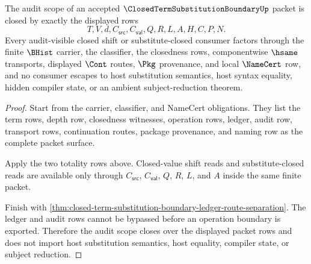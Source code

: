 \begin{theorem}
\label{thm:closed-term-substitution-boundary-audit-scope-closure}
The audit scope of an accepted $\ClosedTermSubstitutionBoundaryUp$ packet is
closed by exactly the displayed rows
$$
T,V,d,C_{\mathsf{src}},C_{\mathsf{val}},Q,R,L,A,H,C,P,N.
$$
Every audit-visible closed shift or substitute-closed consumer factors through
the finite $\BHist$ carrier, the classifier, the closedness rows,
componentwise $\hsame$ transports, displayed $\Cont$ routes, $\Pkg$ provenance,
and local $\NameCert$ row, and no consumer escapes to host substitution
semantics, host syntax equality, hidden compiler state, or an ambient
subject-reduction theorem.
\end{theorem}
\begin{proof}
Start from the carrier, classifier, and NameCert obligations. They list the
term rows, depth row, closedness witnesses, operation rows, ledger, audit row,
transport rows, continuation routes, package provenance, and naming row as the
complete packet surface.

Apply the two totality rows above. Closed-value shift reads and
substitute-closed reads are available only through $C_{\mathsf{src}}$,
$C_{\mathsf{val}}$, $Q$, $R$, $L$, and $A$ inside the same finite packet.

Finish with \autoref{thm:closed-term-substitution-boundary-ledger-route-separation}.
The ledger and audit rows cannot be bypassed before an operation boundary is
exported. Therefore the audit scope closes over the displayed packet rows and
does not import host substitution semantics, host equality, compiler state, or
subject reduction.
\end{proof}

